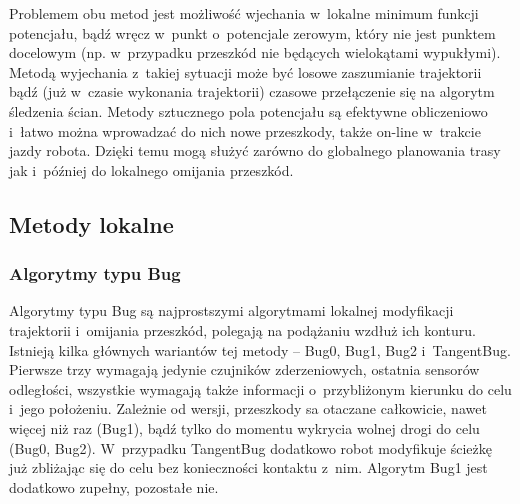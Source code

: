 Problemem obu metod jest możliwość
wjechania w~lokalne minimum funkcji potencjału, bądź wręcz w~punkt o~potencjale zerowym,
który nie jest punktem docelowym (np. w~przypadku przeszkód nie będących wielokątami
wypukłymi). Metodą wyjechania z~takiej sytuacji może być losowe zaszumianie trajektorii
bądź (już w~czasie wykonania trajektorii) czasowe przełączenie się na algorytm śledzenia
ścian. Metody sztucznego pola potencjału są efektywne obliczeniowo i~łatwo można wprowadzać
do nich nowe przeszkody, także on-line w~trakcie jazdy robota. Dzięki temu mogą służyć
zarówno do globalnego planowania trasy jak i~później do lokalnego omijania przeszkód.

\subsection{Metody lokalne}

\subsubsection{Algorytmy typu Bug}

Algorytmy typu Bug są najprostszymi algorytmami lokalnej modyfikacji
trajektorii i~omijania przeszkód, polegają na podążaniu wzdłuż ich konturu.
Istnieją kilka głównych wariantów tej metody -- Bug0, Bug1, Bug2 i~TangentBug.
Pierwsze trzy wymagają jedynie czujników zderzeniowych, ostatnia sensorów odległości,
wszystkie wymagają także informacji o~przybliżonym kierunku do celu i~jego położeniu.
Zależnie od wersji, przeszkody sa otaczane całkowicie, nawet więcej niż raz (Bug1),
bądź tylko do momentu wykrycia wolnej drogi do celu (Bug0, Bug2). W~przypadku TangentBug
dodatkowo robot modyfikuje ścieżkę już zbliżając się do celu bez konieczności kontaktu
z~nim. Algorytm Bug1 jest dodatkowo zupełny, pozostałe nie.

